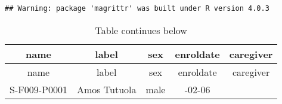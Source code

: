 \documentclass[
]{article}
\begin{document}
\begin{verbatim}
## Warning: package 'magrittr' was built under R version 4.0.3
\end{verbatim}

\begin{longtable}[]{@{}ccccc@{}}
\caption{Table continues below}\tabularnewline
\toprule
\begin{minipage}[b]{0.17\columnwidth}\centering
name\strut
\end{minipage} & \begin{minipage}[b]{0.23\columnwidth}\centering
label\strut
\end{minipage} & \begin{minipage}[b]{0.10\columnwidth}\centering
sex\strut
\end{minipage} & \begin{minipage}[b]{0.15\columnwidth}\centering
enroldate\strut
\end{minipage} & \begin{minipage}[b]{0.21\columnwidth}\centering
caregiver\strut
\end{minipage}\tabularnewline
\midrule
\endfirsthead
\toprule
\begin{minipage}[b]{0.17\columnwidth}\centering
name\strut
\end{minipage} & \begin{minipage}[b]{0.23\columnwidth}\centering
label\strut
\end{minipage} & \begin{minipage}[b]{0.10\columnwidth}\centering
sex\strut
\end{minipage} & \begin{minipage}[b]{0.15\columnwidth}\centering
enroldate\strut
\end{minipage} & \begin{minipage}[b]{0.21\columnwidth}\centering
caregiver\strut
\end{minipage}\tabularnewline
\midrule
\endhead
\begin{minipage}[t]{0.17\columnwidth}\centering
S-F009-P0001\strut
\end{minipage} & \begin{minipage}[t]{0.23\columnwidth}\centering
Amos Tutuola\strut
\end{minipage} & \begin{minipage}[t]{0.10\columnwidth}\centering
male\strut
\end{minipage} & \begin{minipage}[t]{0.15\columnwidth}\centering
2021-02-06\strut
\end{minipage} & \begin{minipage}[t]{0.21\columnwidth}\centering

\end{minipage}
\end{longtable}
\end{document}
